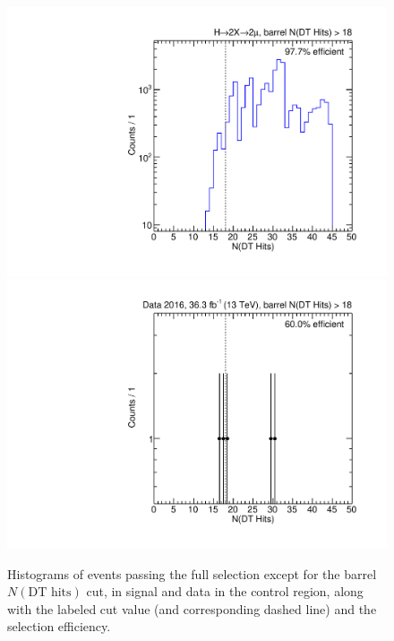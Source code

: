 \begin{figure}[p]
  \centering
  \includegraphics[width=\DSquareWidth]{figures/displaced/NM1_2Mu2J_nDTHits.pdf}
  \hspace*{-2em}
  \includegraphics[width=\DSquareWidth]{figures/displaced/NM1_Data_nDTHits.pdf}
  \caption[Histograms of events passing the full selection except for the barrel $N(\text{DT hits})$ cut in \twoMu signal and data.]{Histograms of events passing the full selection except for the barrel $N(\text{DT hits})$ cut, in  \twoMu signal and  data in the control region, along with the labeled cut value (and corresponding dashed line) and the selection efficiency.}
  \label{fig:dd:NM1_nDTHits}
\end{figure}

